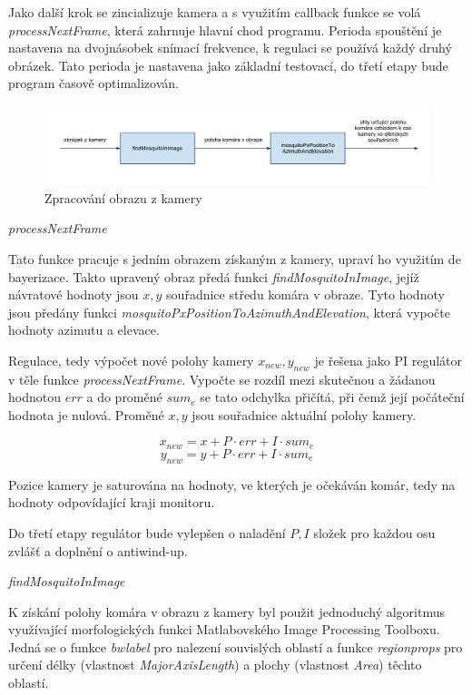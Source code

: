 \documentclass[a4paper,10pt]{article}
\begin{document}
		Jako další krok se zincializuje kamera a s využitím
		callback funkce se volá \textit{processNextFrame}, která zahrnuje hlavní chod
		programu. Perioda spouštění je nastavena na dvojnásobek snímací frekvence, k regulaci se používá každý druhý obrázek.
		Tato perioda je nastavena jako základní testovací, do třetí etapy bude program časově optimalizován.

		\begin{figure}[!h]
			\centering
			 \includegraphics[width=1\columnwidth]{pics/zpracovani_obrazu_z_kamery}
			 \caption{Zpracování obrazu z kamery\label{fig:zpracovaniObrazu}}
		\end{figure}


\vspace{0.5cm}
\textit{processNextFrame}

		Tato funkce pracuje s jedním obrazem získaným z kamery, upraví ho využitím de
		bayerizace. Takto upravený obraz předá funkci \textit{findMosquitoInImage},
		jejíž návratové hodnoty jsou $x, y$ souřadnice středu komára v obraze. Tyto
		hodnoty jsou předány funkci \textit{mosquitoPxPositionToAzimuthAndElevation},
		která vypočte hodnoty azimutu a elevace. 

	        Regulace, tedy výpočet nové polohy kamery $x_{new}, y_{new}$ je řešena jako PI
		regulátor v těle funkce \textit{processNextFrame}. 
	        Vypočte se rozdíl mezi skutečnou a žádanou hodnotou $err$ a do
		proměné $sum_e$ se tato odchylka přičítá, při čemž její počáteční hodnota je
		nulová. Proměné $x, y$ jsou souřadnice aktuální polohy kamery.

		$$x_{new} = x + P\cdot err + I\cdot sum_e$$
		$$y_{new} = y + P\cdot err + I\cdot sum_e$$

		Pozice kamery je saturována na hodnoty, ve
		kterých je očekáván komár, tedy na hodnoty odpovídající kraji monitoru.

		Do třetí etapy regulátor bude vylepšen o naladění $P, I$ složek pro každou osu
		zvlášť a doplnění o antiwind-up. 

		\vspace{0.5cm}
		\textit{findMosquitoInImage}

		K získání polohy komára v obrazu z kamery byl použit jednoduchý algoritmus
		využívající morfologických funkci Matlabovského Image Processing Toolboxu. Jedná
		se o funkce \textit{bwlabel} pro nalezení souvislých oblastí a funkce
		\textit{regionprops} pro určení délky (vlastnost \textit{MajorAxisLength}) a
		plochy (vlastnost \textit{Area}) těchto oblastí.
\end{document}
